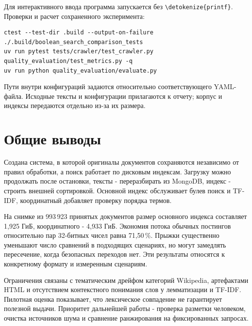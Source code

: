 \documentclass[pdf,unicode,12pt,a4paper,oneside,fleqn]{article}
\DeclareRobustCommand{\code}[1]{\expandafter\nolinkurl\expandafter{\detokenize{#1}}}
\begin{document}
Для интерактивного ввода программа запускается без \code{printf}.
Проверки и расчет сохраненного эксперимента:

\begin{lstlisting}
ctest --test-dir .build --output-on-failure
./.build/boolean_search_comparison_tests
uv run pytest tests/crawler/test_crawler.py quality_evaluation/test_metrics.py -q
uv run python quality_evaluation/evaluate.py
\end{lstlisting}

Пути внутри конфигураций задаются относительно соответствующего YAML-файла.
Исходные тексты и конфигурации прилагаются к отчету; корпус и индексы
передаются отдельно из-за их размера.

\clearpage
\section*{Общие выводы}

Создана система, в которой оригиналы документов сохраняются независимо
от правил обработки, а поиск работает по дисковым индексам. Загрузку можно
продолжать после остановки, тексты - переразбирать из MongoDB, индекс - строить
внешней сортировкой. Основной индекс обслуживает булев поиск и TF-IDF,
координатный добавляет проверку порядка термов.

На снимке из 993\,923 принятых документов размер основного индекса составляет
1,925 ГиБ, координатного - 4,933 ГиБ. Экономия потока обычных постингов
относительно пар 32-битных чисел равна 71,50\,\%. Прыжки существенно
уменьшают число сравнений в подходящих сценариях, но могут замедлять
пересечение, когда безопасных переходов нет. Эти результаты относятся
к конкретному формату и измеренным сценариям.

Ограничения связаны с тематическим дрейфом категорий Wikipedia, артефактами
HTML и отсутствием контекстного понимания слов у лемматизации и TF-IDF.
Пилотная оценка показывает, что лексическое совпадение не гарантирует
полезной выдачи. Приоритет дальнейшей работы - проверка разметки человеком,
очистка источников шума и сравнение ранжирования на фиксированных запросах.
\end{document}
